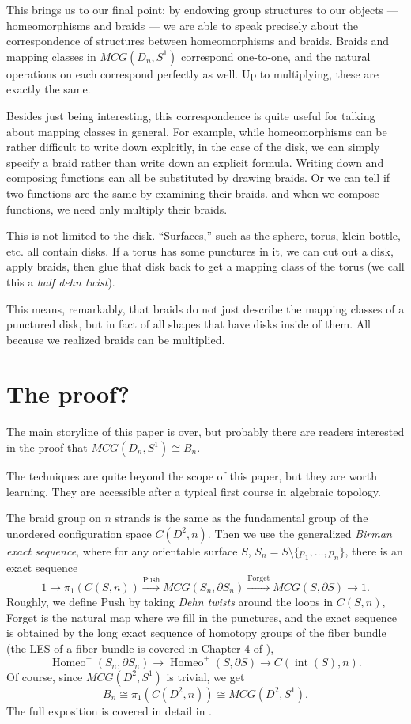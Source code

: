 \documentclass{amsart}
\DeclareMathOperator{\itr}{int}
\DeclareMathOperator{\Homeo}{Homeo}
\begin{document}
This brings us to our final point: by endowing group structures to our objects
--- homeomorphisms and braids --- we are able to speak precisely about the
correspondence of structures between homeomorphisms and braids. Braids and
mapping classes in \(MCG(D_n, S^1)\) correspond one-to-one, and the natural
operations on each correspond perfectly as well. Up to multiplying, these are
exactly the same.

Besides just being interesting, this correspondence is quite useful for talking
about mapping classes in general. For example, while homeomorphisms can be
rather difficult to write down explcitly, in the case of the disk, we can
simply specify a braid rather than write down an explicit formula. Writing down
and composing functions can all be substituted by drawing braids. Or we
can tell if two functions are the same by examining their braids. and when we
compose functions, we need only multiply their braids.

This is not limited to the disk. ``Surfaces,'' such as the sphere, torus, klein
bottle, etc. all contain disks. If a torus has some punctures in it, we can cut
out a disk, apply braids, then glue that disk back to get a mapping class of
the torus (we call this a \emph{half dehn twist}). 

This means, remarkably, that braids do not just describe the mapping classes of
a punctured disk, but in fact of all shapes that have disks inside of them. All
because we realized braids can be multiplied.

\section{The proof?}
The main storyline of this paper is over, but probably there are readers
interested in the proof that \(MCG(D_n, S^1)\cong B_n\). 

The techniques are quite beyond the scope of this paper, but they are worth
learning. They are accessible after a typical first course in algebraic
topology.

The braid group on \(n\) strands is the same as the fundamental group of the
unordered configuration space \(C(D^2, n)\). Then we use the generalized
\emph{Birman exact sequence}, where for any orientable surface \(S\), \(S_n =
S\setminus\{p_1, \ldots, p_n\}\), there is an exact sequence 
\[
	1 \to \pi_1(C(S, n))\xrightarrow{\text{Push}} MCG(S_n, \partial
	S_n)\xrightarrow{\text{Forget}} MCG(S, \partial S)\to 1.
\]
Roughly, we define Push by taking \emph{Dehn twists} around the loops in
\(C(S, n)\), Forget is the natural map where we fill in the punctures, and the
exact sequence is obtained by the long exact sequence of homotopy groups of the
fiber bundle (the LES of a fiber bundle is covered in Chapter 4 of
{\cite{hatcherAT}}),
\[
   \Homeo^+(S_n, \partial S_n)\to \Homeo^+(S, \partial S) \to C(\itr (S), n).
\] 
Of course, since \(MCG(D^2, S^1)\) is trivial, we get 
\[
   B_n\cong \pi_1(C(D^2, n))\cong MCG(D^2, S^1).
\]
The full exposition is covered in detail in \cite{primer}.




\printbibliography 
\end{document}
